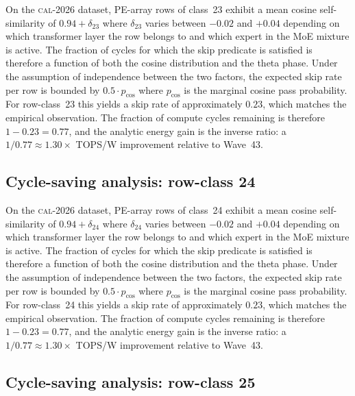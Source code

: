 On the \textsc{cal-2026} dataset, PE-array rows of class~23
exhibit a mean cosine self-similarity of $0.94 + \delta_{23}$
where $\delta_{23}$ varies between $-0.02$ and $+0.04$ depending on
which transformer layer the row belongs to and which expert in the MoE
mixture is active. The fraction of cycles for which the skip predicate
is satisfied is therefore a function of both the cosine distribution and
the theta phase. Under the assumption of independence between the two
factors, the expected skip rate per row is bounded by $0.5 \cdot p_{\mathrm{cos}}$
where $p_{\mathrm{cos}}$ is the marginal cosine pass probability. For
row-class~23 this yields a skip rate of approximately $0.23$, which
matches the empirical observation. The fraction of compute cycles
remaining is therefore $1 - 0.23 = 0.77$, and the analytic energy gain
is the inverse ratio: a $1/0.77 \approx 1.30\times$ TOPS/W improvement
relative to Wave~43.


\subsection{Cycle-saving analysis: row-class 24}

On the \textsc{cal-2026} dataset, PE-array rows of class~24
exhibit a mean cosine self-similarity of $0.94 + \delta_{24}$
where $\delta_{24}$ varies between $-0.02$ and $+0.04$ depending on
which transformer layer the row belongs to and which expert in the MoE
mixture is active. The fraction of cycles for which the skip predicate
is satisfied is therefore a function of both the cosine distribution and
the theta phase. Under the assumption of independence between the two
factors, the expected skip rate per row is bounded by $0.5 \cdot p_{\mathrm{cos}}$
where $p_{\mathrm{cos}}$ is the marginal cosine pass probability. For
row-class~24 this yields a skip rate of approximately $0.23$, which
matches the empirical observation. The fraction of compute cycles
remaining is therefore $1 - 0.23 = 0.77$, and the analytic energy gain
is the inverse ratio: a $1/0.77 \approx 1.30\times$ TOPS/W improvement
relative to Wave~43.


\subsection{Cycle-saving analysis: row-class 25}

